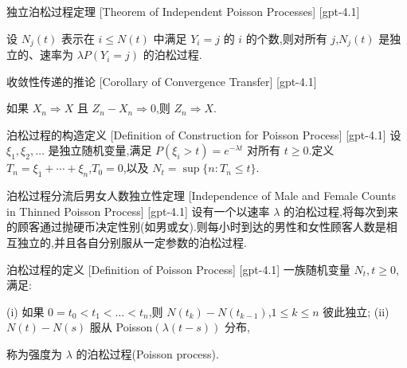 \documentclass[UTF8]{ctexart}
\begin{document}
    
    
    \begin{thm}
        {独立泊松过程定理}
        [Theorem of Independent Poisson Processes]
        [gpt-4.1]
        
设 $N_{j}(t)$ 表示在 $i \leq N(t)$ 中满足 $Y_{i} = j$ 的 $i$ 的个数,则对所有 $j$,$N_{j}(t)$ 是独立的、速率为 $\lambda P(Y_{i}=j)$ 的泊松过程.

    \end{thm}
    
    
    
    \begin{crl}
        {收敛性传递的推论}
        [Corollary of Convergence Transfer]
        [gpt-4.1]
        
如果 $X_n \Rightarrow X$ 且 $Z_n - X_n \Rightarrow 0$,则 $Z_n \Rightarrow X$.

    \end{crl}
    
    
    
    \begin{dfn}
        {泊松过程的构造定义}
        [Definition of Construction for Poisson Process]
        [gpt-4.1]
        设 $\xi_{1}, \xi_{2}, \ldots$ 是独立随机变量,满足 $P(\xi_{i} > t) = e^{-\lambda t}$ 对所有 $t \geq 0$.定义 $T_{n} = \xi_{1} + \cdots + \xi_{n}$,$T_{0} = 0$,以及 $N_{t} = \operatorname*{sup}\{n : T_{n} \leq t\}$.
    \end{dfn}
    
    
    
    \begin{thm}
        {泊松过程分流后男女人数独立性定理}
        [Independence of Male and Female Counts in Thinned Poisson Process]
        [gpt-4.1]
        设有一个以速率 $\lambda$ 的泊松过程,将每次到来的顾客通过抛硬币决定性别(如男或女).则每小时到达的男性和女性顾客人数是相互独立的,并且各自分别服从一定参数的泊松过程.
    \end{thm}
    
    
    
    \begin{dfn}
        {泊松过程的定义}
        [Definition of Poisson Process]
        [gpt-4.1]
        一族随机变量 $N_{t}, t \geq 0$,满足:

(i) 如果 $0 = t_{0} < t_{1} < \dots < t_{n}$,则 $N(t_{k}) - N(t_{k-1})$,$1 \leq k \leq n$ 彼此独立;  
(ii) $N(t) - N(s)$ 服从 Poisson$(\lambda(t - s))$ 分布,

称为强度为 $\lambda$ 的泊松过程(Poisson process).

    \end{dfn}
    
\end{document}
